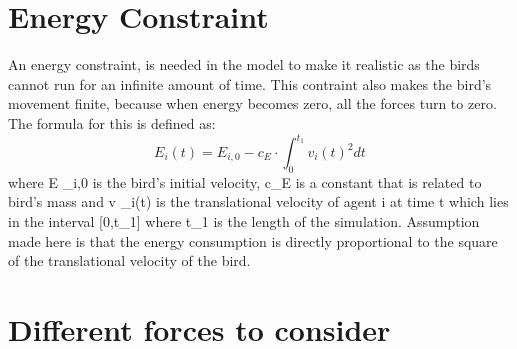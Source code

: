 \documentclass{article}
\begin{document}
\section{Energy Constraint}
An energy constraint, is needed in the model to make it realistic as the birds cannot run for an infinite amount of time. This contraint also makes the bird's movement finite, because when energy becomes zero, all the forces turn to zero. The formula for this is defined as:
\begin{equation}
E _{i} (t) = E _{i,0} - c _{E} \cdot \int_{0}^{t _{1}} v _{i} (t)^2 dt   
\end{equation}
where E _{i,0} is the bird's initial velocity, c_{E} is a constant that is related to bird's mass and v _{i}(t) is the translational velocity of agent i at time t which lies in the interval [0,t_{1}] where t_{1} is the length of the simulation. Assumption made here is that the energy consumption is directly proportional to the square of the translational velocity of the bird.

\section{Different forces to consider}
\end{document}
